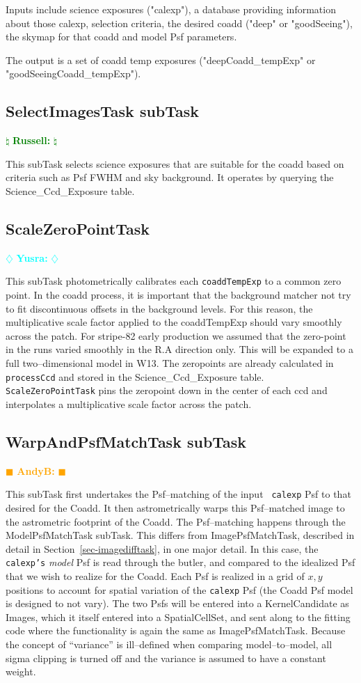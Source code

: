 \documentclass[12pt]{article}
\newcommand{\becker} { \textcolor{orange} {
\ensuremath{\blacksquare} {\bf AndyB:}  
\ensuremath{\blacksquare} } }
\newcommand{\yusra} { \textcolor{cyan} {
\ensuremath{\diamondsuit} {\bf Yusra:}  
\ensuremath{\diamondsuit} } }
\newcommand{\russ} { \textcolor{green} {
\ensuremath{\natural} {\bf Russell:}  
\ensuremath{\natural} } }
\begin{document}
Inputs include science exposures ("calexp"), a database providing information about
those calexp, selection criteria, the desired coadd ("deep" or "goodSeeing"),
the skymap for that coadd and model Psf parameters.

The output is a set of coadd temp exposures ("deepCoadd\_tempExp" or "goodSeeingCoadd\_tempExp").

\subsection{SelectImagesTask subTask} \russ

This subTask selects science exposures that are suitable for the coadd
based on criteria such as Psf FWHM and sky background. It operates by
querying the Science\_Ccd\_Exposure table.

\subsection{ScaleZeroPointTask} \yusra

This subTask  photometrically calibrates each {\tt coaddTempExp} to a common zero point. 
%
In the coadd process, it is important that the background matcher not try to fit discontinuous offsets in the background levels. For this reason, the multiplicative scale factor applied to the coaddTempExp should vary smoothly across the patch. For stripe-82 early production we assumed that the zero-point in the runs varied smoothly in the R.A direction only.  This will be expanded to a full two--dimensional model in W13.  The zeropoints are already calculated in {\tt processCcd} and stored in the Science\_Ccd\_Exposure table. {\tt ScaleZeroPointTask} pins the zeropoint down in the center of each ccd and interpolates a multiplicative scale factor across the patch. 

\subsection{WarpAndPsfMatchTask subTask} \becker

This subTask first undertakes the Psf--matching of the input {\tt
  calexp} Psf to that desired for the Coadd.  It then astrometrically
warps this Psf--matched image to the astrometric footprint of the
Coadd.  The Psf--matching happens through the ModelPsfMatchTask
subTask.  This differs from ImagePsfMatchTask, described in detail in
Section~\ref{sec-imagedifftask}, in one major detail.  In this case,
the {\tt calexp's} {\it model} Psf is read through the butler, and
compared to the idealized Psf that we wish to realize for the Coadd.
Each Psf is realized in a grid of $x,y$ positions to account for
spatial variation of the {\tt calexp} Psf (the Coadd Psf model is
designed to not vary).  The two Psfs will be entered into a
KernelCandidate as Images, which it itself entered into a
SpatialCellSet, and sent along to the fitting code where the
functionality is again the same as ImagePsfMatchTask.  Because the
concept of ``variance'' is ill--defined when comparing
model--to--model, all sigma clipping is turned off and the variance is
assumed to have a constant weight.
\end{document}
